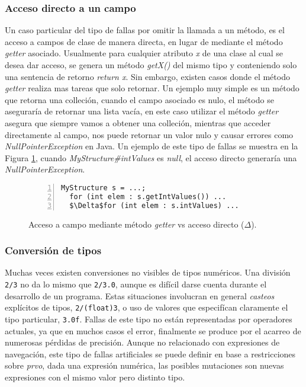 \subsubsection{Acceso directo a un campo}

Un caso particular del tipo de fallas por omitir la llamada a un m\'etodo, es el acceso a campos de clase de manera directa, en lugar de mediante el m\'etodo \emph{getter} asociado. Usualmente para cualquier atributo \emph{x} de una clase al cual se desea dar acceso, se genera un m\'etodo \emph{getX()} del mismo tipo y conteniendo solo una sentencia de retorno \emph{return x}. Sin embargo, existen casos donde el m\'etodo \emph{getter} realiza mas tareas que solo retornar. Un ejemplo muy simple es un m\'etodo que retorna una colleci\'on, cuando el campo asociado es nulo, el m\'etodo se asegurar\'ia de retornar una lista vac\'ia, en este caso utilizar el m\'etodo \emph{getter} asegura que siempre vamos a obtener una colleci\'on, mientras que acceder directamente al campo, nos puede retornar un valor nulo y causar errores como \emph{NullPointerException} en Java. Un ejemplo de este tipo de fallas se muestra en la Figura \ref{figures.examples.getterVsDirectAccess}, cuando \emph{MyStructure\#intValues} es \emph{null}, el acceso directo generar\'ia una \emph{NullPointerException}.

\begin{figure}
	\begin{lstlisting}[frame=single, numbers=left, mathescape=true,framexleftmargin=1.5em]
  MyStructure s = ...;
  for (int elem : s.getIntValues()) ...
  $\Delta$for (int elem : s.intValues) ...
	\end{lstlisting}
	\caption{Acceso a campo mediante m\'etodo \emph{getter} vs acceso directo ($\Delta$).}
	\label{figures.examples.getterVsDirectAccess}
\end{figure}

\subsubsection{Conversi\'on de tipos}

Muchas veces existen conversiones no visibles de tipos num\'ericos. Una divisi\'on \texttt{2/3} no da lo mismo que \texttt{2/3.0}, aunque es dif\'icil darse cuenta durante el desarrollo de un programa. Estas situaciones involucran en general \emph{casteos} expl\'icitos de tipos, \texttt{2/(float)3}, o uso de valores que especif\'ican claramente el tipo particular, \texttt{3.0f}. Fallas de este tipo no est\'an representadas por operadores actuales, ya que en muchos casos el error, finalmente se produce por el acarreo de numerosas p\'erdidas de precisi\'on. Aunque no relacionado con expresiones de navegaci\'on, este tipo de fallas artificiales se puede definir en base a restricciones sobre \emph{prvo}, dada una expresi\'on num\'erica, las posibles mutaciones son nuevas expresiones con el mismo valor pero distinto tipo.

